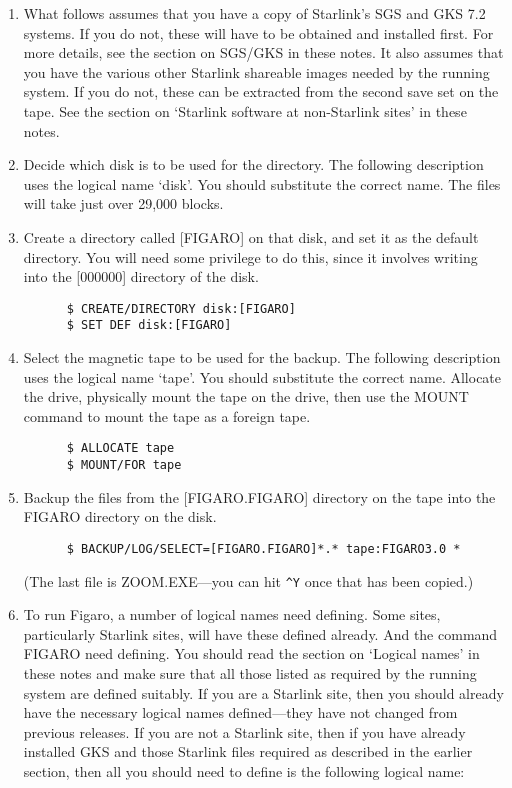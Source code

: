 \begin{enumerate}

\item What follows assumes that you have a copy of Starlink's SGS and GKS  7.2
systems. If you do not, these will have to be obtained and installed first.
For more details, see the section on SGS/GKS in these notes. It also assumes
that you have the various other Starlink shareable images needed  by the
running system.  If you do not, these can be extracted from the second save set
on the tape.  See the section on `Starlink software at non-Starlink sites' in
these notes.

\item Decide which disk is to be used for the directory.  The following
description uses the logical name `disk'. You should substitute the correct
name. The files will take just over 29,000 blocks.

\item Create a directory called [FIGARO] on that disk, and set it as the
default directory. You will need some privilege to do this, since it involves
writing into the [000000] directory of the disk.

\begin{verbatim}
      $ CREATE/DIRECTORY disk:[FIGARO]
      $ SET DEF disk:[FIGARO]
\end{verbatim}

\item Select the magnetic tape to be used for the backup. The following
description uses the logical name `tape'. You should substitute the  correct
name. Allocate the drive, physically mount the tape on the drive, then use the
MOUNT command to mount the tape as a foreign tape.

\begin{verbatim}
      $ ALLOCATE tape
      $ MOUNT/FOR tape
\end{verbatim}

\item Backup the files from the [FIGARO.FIGARO] directory on the tape into
the FIGARO directory on the disk.

\begin{verbatim}
      $ BACKUP/LOG/SELECT=[FIGARO.FIGARO]*.* tape:FIGARO3.0 *
\end{verbatim}

(The last file is ZOOM.EXE---you can hit \verb+^Y+ once that has been copied.)

\item To run Figaro, a number of logical names need defining. Some sites,
particularly Starlink sites, will have these defined already. And the command
FIGARO need defining. You should read the section on `Logical names' in these
notes and make sure that all those listed as required by the running  system
are defined suitably. If you are a Starlink site, then you should already have
the necessary logical names defined---they have not changed from previous
releases. If you are not a Starlink site, then if you have already installed
GKS and those Starlink files required as described in the earlier section, then
all you should need to define is the following logical name:


\end{enumerate}
